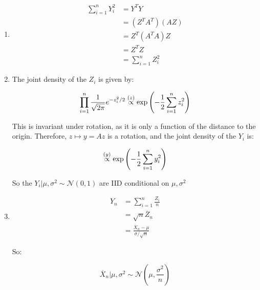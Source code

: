 \documentclass[a4paper]{article}
\begin{document}
                    \begin{enumerate}
                        \item
                            \begin{align*}
                                \sum_{i=1}^n Y_i^2 & = Y^TY \\
                                & = (Z^TA^T)(AZ) \\
                                & = Z^T(A^TA)Z \\
                                & = Z^TZ \\
                                & = \sum_{i=1}^n Z_i^2
                            \end{align*}

                        \item The joint density of the $Z_i$ is given by:

                            \[
                                \prod_{i=1}^n \frac{1}{\sqrt{2\pi}} e^{-z_i^2/2}
                                \stackrel{({z})}{\propto} \exp\left(-\frac{1}{2} \sum_{i=1}^n
                                z_i^2\right)
                            \]

                            This is invariant under rotation, as it is only a
                            function of the distance to the origin. Therefore,
                            $z \mapsto y = Az$ is a rotation, and the joint
                            density of the $Y_i$ is:

                            \[
                                \stackrel{({y})}{\propto} \exp\left(-\frac{1}{2} \sum_{i=1}^n
                                y_i^2\right)
                            \]

                            So the $Y_i | \mu, \sigma^2 \sim \mathcal{N}(0, 1)$
                            are IID conditional on $\mu, \sigma^2$

                        \item
                            \begin{align*}
                                Y_n & = \sum_{i=1}^n \frac{Z_i}{n} \\
                                & = \sqrt{n}\overline Z_n \\
                                & = \frac{\overline X_n - \mu}{\sigma/\sqrt{n}}
                            \end{align*}

                            So:

                            \[
                                \overline X_n | \mu, \sigma^2 \sim
                                \mathcal{N}\left(\mu, \frac{\sigma^2}{n}\right)
                            \]
                    \end{enumerate}
\end{document}
